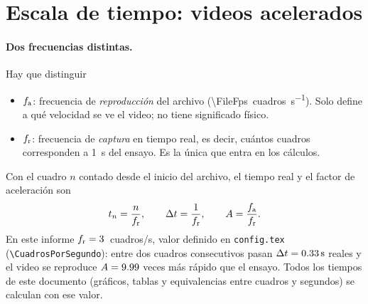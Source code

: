 \section{Escala de tiempo: videos acelerados}\label{sec:escala}

\paragraph{Dos frecuencias distintas.} Hay que distinguir
\begin{itemize}
  \item $f_{\mathrm{a}}$: frecuencia de \emph{reproducción} del archivo (\SI{\FileFps}{cuadros\per\second}). Solo
        define a qué velocidad se ve el video; no tiene significado físico.
  \item $f_{\mathrm{r}}$: frecuencia de \emph{captura} en tiempo real, es decir, cuántos cuadros corresponden a
        \SI{1}{\second} del ensayo. Es la única que entra en los cálculos.
\end{itemize}
Con el cuadro $n$ contado desde el inicio del archivo, el tiempo real y el factor de aceleración son
\begin{equation}
  t_n = \frac{n}{f_{\mathrm{r}}},\qquad \Delta t = \frac{1}{f_{\mathrm{r}}},\qquad A = \frac{f_{\mathrm{a}}}{f_{\mathrm{r}}}.
  \label{eq:tiempo}
\end{equation}
En este informe $f_{\mathrm{r}} = \num{3}$~cuadros/s, valor definido en
\texttt{config.tex} (\verb|\CuadrosPorSegundo|): entre dos cuadros consecutivos pasan
$\Delta t = \EnSeg{1}$ reales y el video se reproduce $A = \CalcNum{\FileFps/\CuadrosPorSegundo}$ veces
más rápido que el ensayo. Todos los tiempos de este documento (gráficos, tablas y equivalencias
entre cuadros y segundos) se calculan con ese valor.

